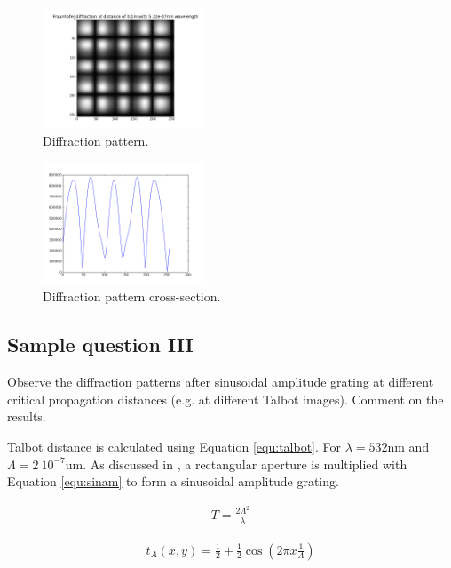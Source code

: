 \documentclass[journal,9pt]{IEEEtran}
\begin{document}
\begin{figure}[H]
\centering
\includegraphics[width=1.9in]{q2d100mm}
\caption{Diffraction pattern.}
\label{fig:q2d100mm}
\end{figure}

\begin{figure}[H]
\centering
\includegraphics[width=1.9in]{q2s100mm}
\caption{Diffraction pattern cross-section.}
\label{fig:q2s100mm}
\end{figure}

\subsection{Sample question III}
 Observe the diffraction patterns after sinusoidal amplitude grating at different critical propagation distances (e.g. at different Talbot images). Comment on the results.

Talbot distance is calculated using Equation \ref{equ:talbot}. For $\lambda=532$nm and $\Lambda=2~10^{-7}$um. As discussed in \cite{goodman2005introduction}, a rectangular aperture is multiplied with Equation \ref{equ:sinam} to form a sinusoidal amplitude grating.

\begin{equation}
\label{equ:talbot}
\begin{split}
T=\frac{2\Lambda^2}{\lambda}
\end{split}
\end{equation}


\begin{equation}
\label{equ:sinam}
\begin{split}
t_A(x,y)=\frac{1}{2}+\frac{1}{2}\cos(2\pi x\frac{1}{\Lambda})
\end{split}
\end{equation}
\end{document}
